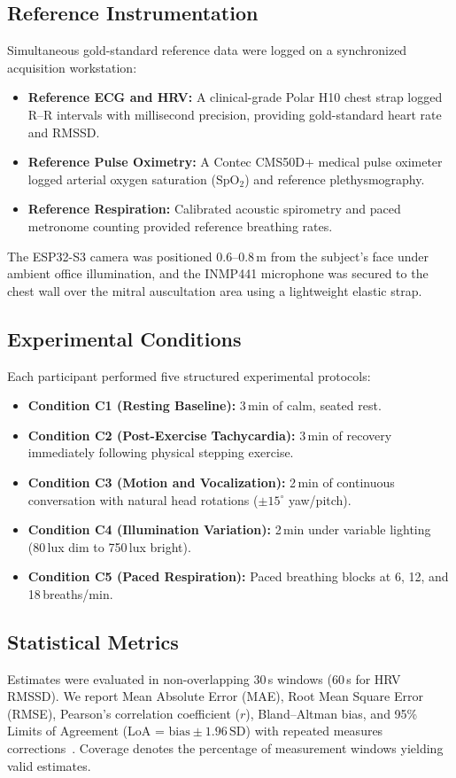 \documentclass[journal]{IEEEtran}
\begin{document}
\subsection{Reference Instrumentation}
Simultaneous gold-standard reference data were logged on a synchronized acquisition workstation:
\begin{itemize}
  \item \textbf{Reference ECG and HRV:} A clinical-grade Polar H10 chest strap logged R--R intervals with millisecond precision, providing gold-standard heart rate and RMSSD.
  \item \textbf{Reference Pulse Oximetry:} A Contec CMS50D+ medical pulse oximeter logged arterial oxygen saturation ($\mathrm{SpO_2}$) and reference plethysmography.
  \item \textbf{Reference Respiration:} Calibrated acoustic spirometry and paced metronome counting provided reference breathing rates.
\end{itemize}
The ESP32-S3 camera was positioned 0.6--0.8\,m from the subject's face under ambient office illumination, and the INMP441 microphone was secured to the chest wall over the mitral auscultation area using a lightweight elastic strap.

\subsection{Experimental Conditions}
Each participant performed five structured experimental protocols:
\begin{itemize}
  \item \textbf{Condition C1 (Resting Baseline):} 3\,min of calm, seated rest.
  \item \textbf{Condition C2 (Post-Exercise Tachycardia):} 3\,min of recovery immediately following physical stepping exercise.
  \item \textbf{Condition C3 (Motion and Vocalization):} 2\,min of continuous conversation with natural head rotations ($\pm 15^\circ$ yaw/pitch).
  \item \textbf{Condition C4 (Illumination Variation):} 2\,min under variable lighting (80\,lux dim to 750\,lux bright).
  \item \textbf{Condition C5 (Paced Respiration):} Paced breathing blocks at 6, 12, and 18\,breaths/min.
\end{itemize}

\subsection{Statistical Metrics}
Estimates were evaluated in non-overlapping 30\,s windows (60\,s for HRV RMSSD). We report Mean Absolute Error (MAE), Root Mean Square Error (RMSE), Pearson's correlation coefficient ($r$), Bland--Altman bias, and 95\% Limits of Agreement (LoA = $\text{bias} \pm 1.96\,\text{SD}$) with repeated measures corrections~\cite{bland2007repeated}. Coverage denotes the percentage of measurement windows yielding valid estimates.
\end{document}
